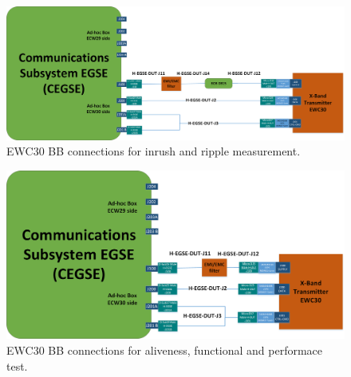 \begin{figure}[H]
	\centering
	  \includegraphics[width=.9\linewidth]{figuras/CEGSE_EWC30SetupA.png}  
	  \caption{EWC30 BB connections for inrush and ripple measurement.}
	\label{fig:ewc30_bb_ripple}
\end{figure}

\begin{figure}[H]
	\centering
	  \includegraphics[width=.7\linewidth]{figuras/CEGSE_EWC30SetupB.png}  
	  \caption{EWC30 BB connections for aliveness, functional and performace test.}
	\label{fig:ewc30_bb}
\end{figure}

